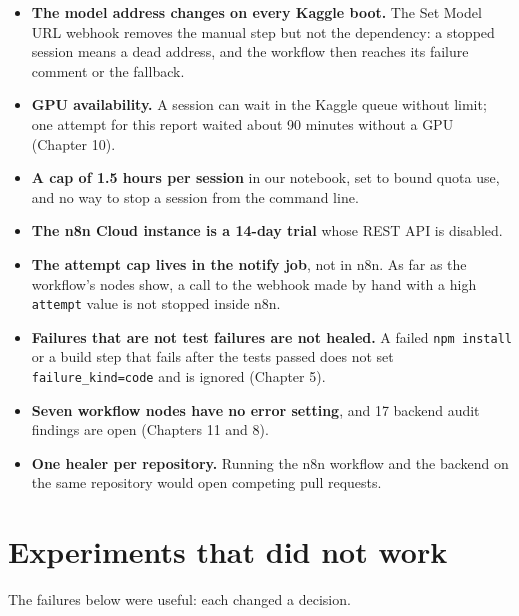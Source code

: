 \documentclass[11pt,a4paper]{report}
\begin{document}
\begin{itemize}[leftmargin=*,itemsep=2pt]
\item \textbf{The model address changes on every Kaggle boot.} The Set Model URL webhook removes the manual step but not the dependency: a stopped session means a dead address, and the workflow then reaches its failure comment or the fallback.
\item \textbf{GPU availability.} A session can wait in the Kaggle queue without limit; one attempt for this report waited about 90 minutes without a GPU (Chapter 10).
\item \textbf{A cap of 1.5 hours per session} in our notebook, set to bound quota use, and no way to stop a session from the command line.
\item \textbf{The n8n Cloud instance is a 14-day trial} whose REST API is disabled.
\item \textbf{The attempt cap lives in the notify job}, not in n8n. As far as the workflow's nodes show, a call to the webhook made by hand with a high \texttt{attempt} value is not stopped inside n8n.
\item \textbf{Failures that are not test failures are not healed.} A failed \texttt{npm install} or a build step that fails after the tests passed does not set \texttt{failure\_\allowbreak{}kind=code} and is ignored (Chapter 5).
\item \textbf{Seven workflow nodes have no error setting}, and 17 backend audit findings are open (Chapters 11 and 8).
\item \textbf{One healer per repository.} Running the n8n workflow and the backend on the same repository would open competing pull requests.
\end{itemize}

\section{Experiments that did not work}

The failures below were useful: each changed a decision.
\end{document}
